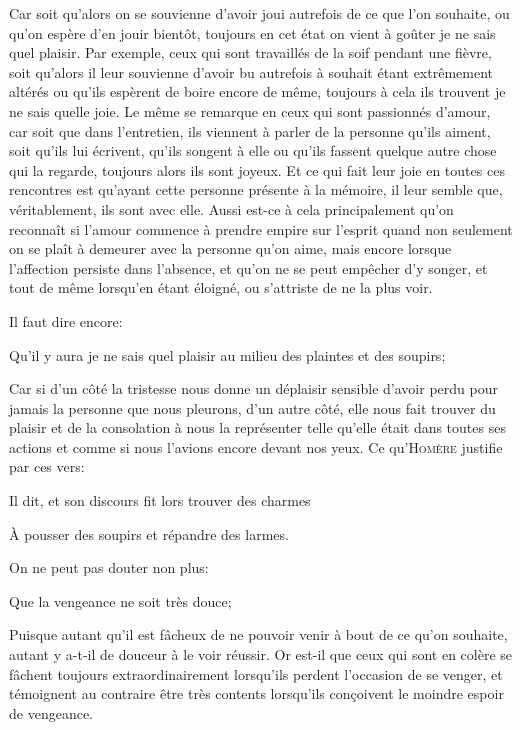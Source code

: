Car soit qu'alors on se souvienne d'avoir joui autrefois de ce que l'on souhaite, ou qu'on espère d'en jouir
bientôt, toujours en cet état on vient à goûter je ne sais quel plaisir. Par exemple, ceux qui sont travaillés
de la soif pendant une fièvre, soit qu'alors il leur souvienne d'avoir bu autrefois à souhait étant extrêmement
altérés ou qu'ils espèrent de boire encore de même, toujours à cela ils trouvent je ne sais quelle joie. Le même
se remarque en ceux qui sont passionnés d'amour, car soit que dans l'entretien, ils viennent à parler de la
personne qu'ils aiment, soit qu'ils lui écrivent, qu'ils songent à elle ou qu'ils fassent quelque autre chose
qui la regarde, toujours alors ils sont joyeux. Et ce qui fait leur joie en toutes ces rencontres est qu'ayant
cette personne présente à la mémoire, il leur semble que, véritablement, ils sont avec elle. Aussi est-ce à cela
principalement qu'on reconnaît si l'amour commence à prendre empire sur l'esprit quand non seulement on se plaît
à demeurer avec la personne qu'on aime, mais encore lorsque l'affection persiste dans l'absence, et qu'on ne se
peut empêcher d'y songer, et tout de même lorsqu'en étant éloigné, ou s’attriste de ne la plus voir.

\bigbreak

Il faut dire encore:

\begin{lieu}
	Qu'il y aura je ne sais quel plaisir au milieu des plaintes et des soupirs;
\end{lieu}

Car si d'un côté la tristesse nous donne un déplaisir sensible d'avoir perdu pour jamais la personne que nous
pleurons, d'un autre côté, elle nous fait trouver du plaisir et de la consolation à nous la représenter telle
qu'elle était dans toutes ses actions et comme si nous l'avions encore devant nos yeux. Ce qu'\textsc{Homère}
justifie par ces vers:

\begin{emphpar}
	Il dit, et son discours fit lors trouver des charmes

	À pousser des soupirs et répandre des larmes.
\end{emphpar}

\bigbreak

On ne peut pas douter non plus:

\begin{lieu}
	Que la vengeance ne soit très douce;
\end{lieu}

Puisque autant qu'il est fâcheux de ne pouvoir venir à bout de ce qu'on souhaite, autant y a-t-il de douceur à
le voir réussir. Or est-il que ceux qui sont en colère se fâchent toujours extraordinairement lorsqu'ils perdent
l'occasion de se venger, et témoignent au contraire être très contents lorsqu'ils conçoivent le moindre espoir
de vengeance. 

